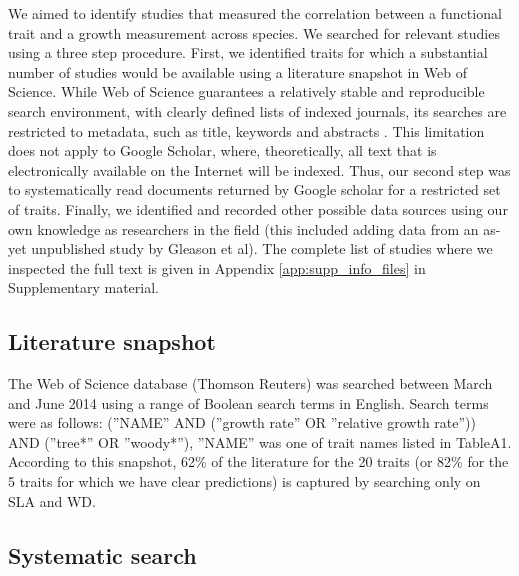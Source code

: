 \documentclass[a4paper]{article}\usepackage[]{graphicx}\usepackage[]{color}
\begin{document}
We aimed to identify studies that measured the correlation between a functional trait and a growth measurement across species. We searched for relevant studies using a three step procedure. First, we identified traits for which a substantial number of studies would be available using a literature snapshot in Web of Science. While Web of Science guarantees a relatively stable and reproducible search environment, with clearly defined lists of indexed journals, its searches are restricted to metadata, such as title, keywords and abstracts \citep{Beckmann:2012hn}. This limitation does not apply to Google Scholar, where, theoretically, all text that is electronically available on the Internet will be indexed. Thus, our second step was to systematically read documents returned by Google scholar for a restricted set of traits. Finally, we identified and recorded other possible data sources using our own knowledge as researchers in the field (this included adding data from an as-yet unpublished study by Gleason et al). The complete list of studies where we inspected the full text is given in Appendix \ref{app:supp_info_files} in Supplementary material.

\subsection*{Literature snapshot}\label{literature-snapshot}

The Web of Science database (Thomson Reuters) was searched between March and June 2014 using a range of Boolean search terms in English. Search terms were as follows: (''NAME'' AND (''growth rate'' OR ''relative growth rate'')) AND (''tree*'' OR ''woody*''), ''NAME'' was one of trait names listed in TableA1. According to this snapshot, 62\% of the literature for the 20 traits (or 82\% for the 5 traits for which we have clear predictions) is captured by searching only on SLA and WD.

\subsection*{Systematic search}\label{systematic-search}
\end{document}
